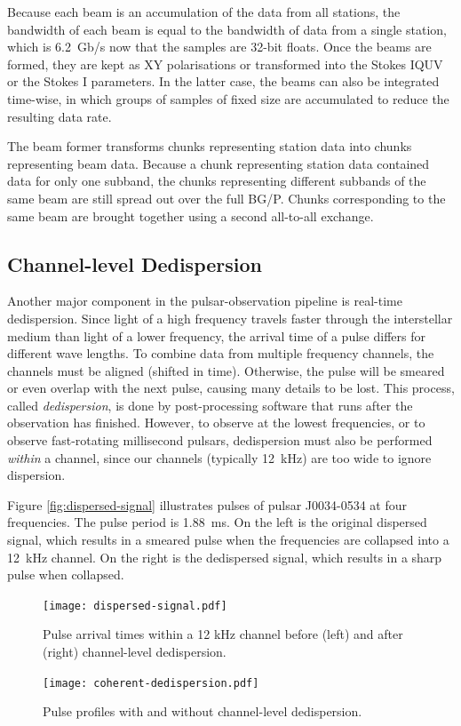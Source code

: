 \documentclass{llncs}
\begin{document}
Because each beam is an accumulation of the data from all stations, the bandwidth of each beam is equal to the bandwidth of data from a single station, which is 6.2~Gb/s now that the samples are 32-bit floats. Once the beams are formed, they are kept as XY polarisations or transformed into the Stokes IQUV or the Stokes I parameters. In the latter case, the beams can also be integrated time-wise, in which groups of samples of fixed size are accumulated to reduce the resulting data rate.

The beam former transforms chunks representing station data into chunks representing beam data. Because a chunk representing station data contained data for only one subband, the chunks representing different subbands of the same beam are still spread out over the full BG/P. Chunks corresponding to the same beam are brought together using a second all-to-all exchange.

\subsection{Channel-level Dedispersion}

Another major component in the pulsar-observation pipeline is real-time dedispersion.  Since light of a high frequency travels faster through the interstellar medium than light of a lower frequency, the arrival time of a pulse differs for different wave lengths. To combine data from multiple frequency channels, the channels must be aligned (shifted in time). Otherwise, the pulse will be smeared or even overlap with the next pulse, causing many details to be lost. This process, called \emph{dedispersion}, is done by post-processing software that runs after the observation has finished.  However, to observe at the lowest frequencies, or to observe fast-rotating millisecond pulsars, dedispersion must also be performed \emph{within\/} a channel, since our channels (typically 12~kHz) are too wide to ignore dispersion.

Figure \ref{fig:dispersed-signal} illustrates pulses of pulsar J0034-0534 at four frequencies. The pulse period is 1.88~ms. On the left is the original dispersed signal, which results in a smeared pulse when the frequencies are collapsed into a 12~kHz channel. On the right is the dedispersed signal, which results in a sharp pulse when collapsed.

\begin{figure}[ht]
\begin{minipage}[t]{0.60\textwidth}
\center
\texttt{[image: dispersed-signal.pdf]}
\caption{Pulse arrival times within a 12 kHz channel before (left) and after (right) channel-level dedispersion.}
\label{fig:dispersed-signal}
\end{minipage}
\hfill
\begin{minipage}[t]{0.35\textwidth}
\center
\texttt{[image: coherent-dedispersion.pdf]}
\caption{Pulse profiles with and without channel-level dedispersion.}
\label{fig:dedispersion-result}
\end{minipage}
\end{figure}
\end{document}
